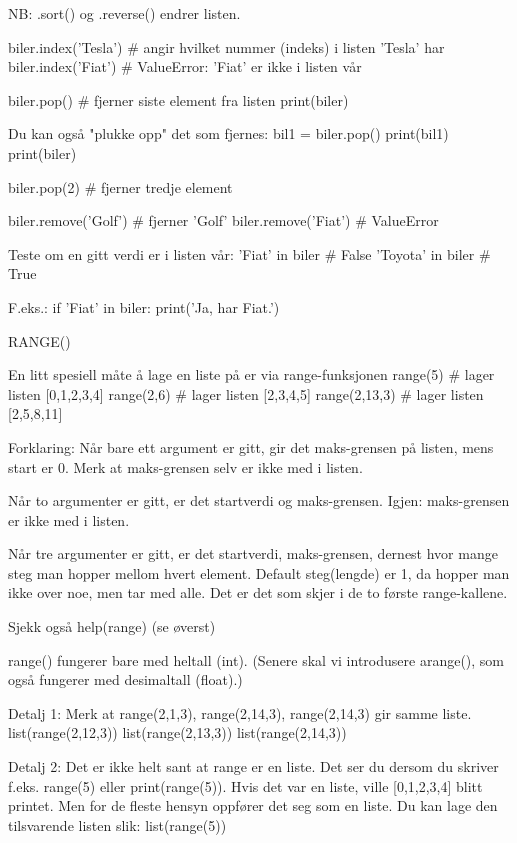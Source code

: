 \documentclass[a4paper,11pt,utf8]{book}
\begin{document}
NB: .sort() og .reverse() endrer listen. 

biler.index('Tesla')  # angir hvilket nummer (indeks) i listen 'Tesla' har 
biler.index('Fiat')   # ValueError: 'Fiat' er ikke i listen vår 

biler.pop()           # fjerner siste element fra listen
print(biler)


Du kan også "plukke opp" det som fjernes:
bil1 = biler.pop()
print(bil1)
print(biler)

biler.pop(2)          # fjerner tredje element 

biler.remove('Golf')  # fjerner 'Golf'
biler.remove('Fiat')  # ValueError

Teste om en gitt verdi er i listen vår:
'Fiat' in biler       # False
'Toyota' in biler     # True

F.eks.:
if 'Fiat' in biler:
   print('Ja, har Fiat.')






RANGE()

En litt spesiell måte å lage en liste på er via range-funksjonen
range(5)        # lager listen [0,1,2,3,4]  
range(2,6)      # lager listen [2,3,4,5]
range(2,13,3)   # lager listen [2,5,8,11]

Forklaring: 
Når bare ett argument er gitt, gir det maks-grensen på listen, mens start er 0.
Merk at maks-grensen selv er ikke med i listen.

Når to argumenter er gitt, er det startverdi og maks-grensen.
Igjen: maks-grensen er ikke med i listen. 

Når tre argumenter er gitt, er det startverdi, maks-grensen, dernest hvor mange
steg man hopper mellom hvert element.
Default steg(lengde) er 1, da hopper man ikke over noe, men tar med alle.
Det er det som skjer i de to første range-kallene. 

Sjekk også 
help(range)
(se øverst) 



range() fungerer bare med heltall (int).
(Senere skal vi introdusere arange(), som også fungerer med desimaltall (float).) 


Detalj 1: Merk at range(2,1,3), range(2,14,3), range(2,14,3) gir samme liste. 
list(range(2,12,3))
list(range(2,13,3))
list(range(2,14,3))


Detalj 2: Det er ikke helt sant at range er en liste.
Det ser du dersom du skriver f.eks. range(5) eller print(range(5)).
Hvis det var en liste, ville [0,1,2,3,4] blitt printet. 
Men for de fleste hensyn oppfører det seg som en liste. 
Du kan lage den tilsvarende listen slik:
list(range(5))
\end{document}
